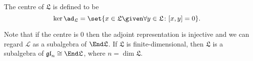 The centre of $\mathfrak{L}$ is defined to be
\[ \ker\ad_{\mathfrak{L}} = \set{x \in \mathfrak{L}\given \forall y \in \mathfrak{L}\colon [x, y] = 0}. \]

Note that if the centre is $0$ then the adjoint representation is injective and
we can regard $\mathcal{L}$ as a subalgebra of $\End \mathfrak{L}$. If
$\mathfrak{L}$ is finite-dimensional, then $\mathfrak{L}$ is a subalgebra of
$\mathfrak{gl}_n\cong \End \mathfrak{L}$, where $n = \dim \mathfrak{L}$.
